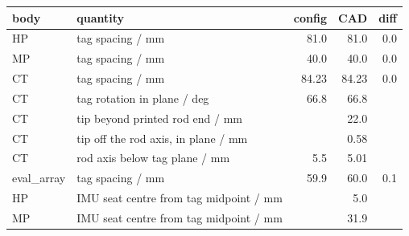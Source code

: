 
\begin{tabular}{llrrr}
\toprule
body & quantity & config & CAD & diff \\
\midrule
HP & tag spacing / mm & 81.0 & 81.0 & 0.0 \\
MP & tag spacing / mm & 40.0 & 40.0 & 0.0 \\
CT & tag spacing / mm & 84.23 & 84.23 & 0.0 \\
CT & tag rotation in plane / deg & 66.8 & 66.8 &  \\
CT & tip beyond printed rod end / mm &  & 22.0 &  \\
CT & tip off the rod axis, in plane / mm &  & 0.58 &  \\
CT & rod axis below tag plane / mm & 5.5 & 5.01 &  \\
eval\_array & tag spacing / mm & 59.9 & 60.0 & 0.1 \\
HP & IMU seat centre from tag midpoint / mm &  & 5.0 &  \\
MP & IMU seat centre from tag midpoint / mm &  & 31.9 &  \\
\bottomrule
\end{tabular}
